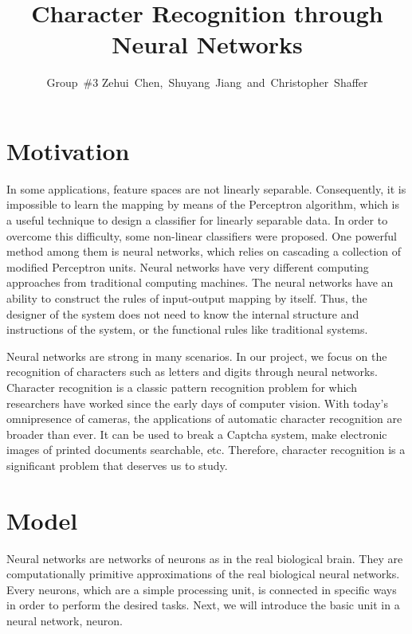 \documentclass[journal,a4paper,onecolumn,11pt]{IEEEtran}
\title{Character Recognition through Neural Networks}
\author{Group~\#3 Zehui~Chen,~Shuyang~Jiang~and~Christopher~Shaffer}
\begin{document}
\maketitle

\section{Motivation}
In some applications, feature spaces are not linearly separable. Consequently, it is impossible to learn the mapping by means of the Perceptron algorithm, which is a useful technique to design a classifier for linearly separable data. In order to overcome this difficulty, some non-linear classifiers were proposed. One powerful method among them is neural networks, which relies on cascading a collection of modified Perceptron units. Neural networks have very different computing approaches from traditional computing machines. The neural networks have an ability to construct the rules of input-output mapping by itself. Thus, the designer of the system does not need to know the internal structure and instructions of the system, or the functional rules like traditional systems. 

Neural networks are strong in many scenarios. In our project, we focus on the recognition of characters such as letters and digits through neural networks. Character recognition is a classic pattern recognition problem for which researchers have worked since the early days of computer vision. With today's omnipresence of cameras, the applications of automatic character recognition are broader than ever. It can be used to break a Captcha system, make electronic images of printed documents searchable, etc. Therefore, character recognition is a significant problem that deserves us to study.

\section{Model}
Neural networks are networks of neurons as in the real biological brain. They are computationally primitive approximations of the real biological neural networks. Every neurons, which are a simple processing unit, is connected in specific ways in order to perform the desired tasks. Next, we will introduce the basic unit in a neural network, neuron.
\end{document}
